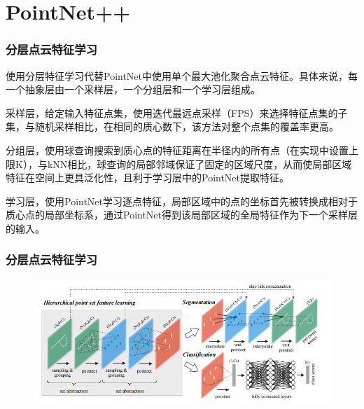 \section{PointNet++}


\begin{frame}
\frametitle{分层点云特征学习}
    
使用分层特征学习代替PointNet中使用单个最大池化聚合点云特征。具体来说，每一个抽象层由一个采样层，一个分组层和一个学习层组成。

采样层，给定输入特征点集，使用迭代最远点采样（FPS）来选择特征点集的子集，与随机采样相比，在相同的质心数下，该方法对整个点集的覆盖率更高。

分组层，使用球查询搜索到质心点的特征距离在半径内的所有点（在实现中设置上限K），与kNN相比，球查询的局部邻域保证了固定的区域尺度，从而使局部区域特征在空间上更具泛化性，且利于学习层中的PointNet提取特征。

学习层，使用PointNet学习逐点特征，局部区域中的点的坐标首先被转换成相对于质心点的局部坐标系，通过PointNet得到该局部区域的全局特征作为下一个采样层的输入。




\end{frame}


\begin{frame}
\frametitle{分层点云特征学习}

\begin{figure}
\includegraphics[scale=0.7]{doc/img/f2.png}
\end{figure}
    
\end{frame}


